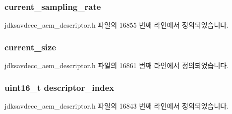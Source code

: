 \subsubsection[{\texorpdfstring{current\+\_\+sampling\+\_\+rate}{current_sampling_rate}}]{ current\+\_\+sampling\+\_\+rate}\hypertarget{structjdksavdecc__descriptor__video__unit__cluster_a081e14c5c832a659daf22003ed8e918d}{}\label{structjdksavdecc__descriptor__video__unit__cluster_a081e14c5c832a659daf22003ed8e918d}


jdksavdecc\+\_\+aem\+\_\+descriptor.\+h 파일의 16855 번째 라인에서 정의되었습니다.

\subsubsection[{\texorpdfstring{current\+\_\+size}{current_size}}]{ current\+\_\+size}\hypertarget{structjdksavdecc__descriptor__video__unit__cluster_a8444502ec86f883b4c80ebd5b8218b07}{}\label{structjdksavdecc__descriptor__video__unit__cluster_a8444502ec86f883b4c80ebd5b8218b07}


jdksavdecc\+\_\+aem\+\_\+descriptor.\+h 파일의 16861 번째 라인에서 정의되었습니다.

\subsubsection[{\texorpdfstring{descriptor\+\_\+index}{descriptor_index}}]{\setlength{\rightskip}{0pt plus 5cm}uint16\+\_\+t descriptor\+\_\+index}\hypertarget{structjdksavdecc__descriptor__video__unit__cluster_a042bbc76d835b82d27c1932431ee38d4}{}\label{structjdksavdecc__descriptor__video__unit__cluster_a042bbc76d835b82d27c1932431ee38d4}


jdksavdecc\+\_\+aem\+\_\+descriptor.\+h 파일의 16843 번째 라인에서 정의되었습니다.

